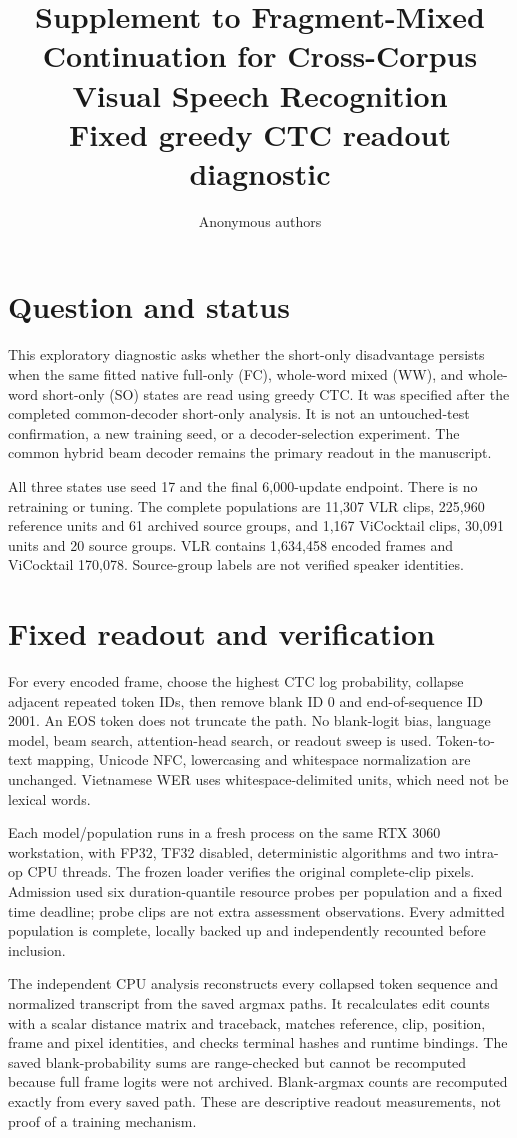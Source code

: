 \documentclass[12pt,a4paper]{article}
\title{Supplement to Fragment-Mixed Continuation for Cross-Corpus Visual Speech Recognition\\[0.7em]
\large Fixed greedy CTC readout diagnostic}
\author{Anonymous authors}
\date{}
\begin{document}
\maketitle
\section{Question and status}
This exploratory diagnostic asks whether the short-only disadvantage persists
when the same fitted native full-only (FC), whole-word mixed (WW), and whole-word
short-only (SO) states are read using greedy CTC. It was specified after the
completed common-decoder short-only analysis. It is not an untouched-test
confirmation, a new training seed, or a decoder-selection experiment. The
common hybrid beam decoder remains the primary readout in the manuscript.

All three states use seed 17 and the final 6,000-update endpoint. There is no
retraining or tuning. The complete populations are 11,307 VLR clips, 225,960
reference units and 61 archived source groups, and 1,167 ViCocktail clips,
30,091 units and 20 source groups. VLR contains 1,634,458 encoded frames and
ViCocktail 170,078. Source-group labels are not verified speaker identities.

\section{Fixed readout and verification}
For every encoded frame, choose the highest CTC log probability, collapse
adjacent repeated token IDs, then remove blank ID 0 and end-of-sequence ID 2001.
An EOS token does not truncate the path. No blank-logit bias, language model,
beam search, attention-head search, or readout sweep is used. Token-to-text
mapping, Unicode NFC, lowercasing and whitespace normalization are unchanged.
Vietnamese WER uses whitespace-delimited units, which need not be lexical words.

Each model/population runs in a fresh process on the same RTX 3060 workstation,
with FP32, TF32 disabled, deterministic algorithms and two intra-op CPU threads.
The frozen loader verifies the original complete-clip pixels. Admission used
six duration-quantile resource probes per population and a fixed time deadline;
probe clips are not extra assessment observations. Every admitted population
is complete, locally backed up and independently recounted before inclusion.

The independent CPU analysis reconstructs every collapsed token sequence and
normalized transcript from the saved argmax paths. It recalculates edit counts
with a scalar distance matrix and traceback, matches reference, clip, position,
frame and pixel identities, and checks terminal hashes and runtime bindings.
The saved blank-probability sums are range-checked but cannot be recomputed
because full frame logits were not archived. Blank-argmax counts are recomputed
exactly from every saved path. These are descriptive readout measurements,
not proof of a training mechanism.
\end{document}
